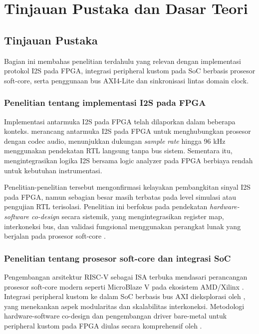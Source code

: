 \chapter{Tinjauan Pustaka dan Dasar Teori}

\section{Tinjauan Pustaka}

Bagian ini membahas penelitian terdahulu yang relevan dengan implementasi protokol I2S pada FPGA, integrasi peripheral kustom pada SoC berbasis prosesor soft-core, serta penggunaan bus AXI4-Lite dan sinkronisasi lintas domain clock.

\subsection{Penelitian tentang implementasi I2S pada FPGA}

Implementasi antarmuka I2S pada FPGA telah dilaporkan dalam beberapa konteks. \citep{sang_i2s_codec_2020} merancang antarmuka I2S pada FPGA untuk menghubungkan prosesor dengan codec audio, menunjukkan dukungan \textit{sample rate} hingga 96 kHz menggunakan pendekatan RTL langsung tanpa bus sistem. Sementara itu, \citep{kaviani_i2s_fpga_2017} mengintegrasikan logika I2S bersama logic analyzer pada FPGA berbiaya rendah untuk kebutuhan instrumentasi.

Penelitian-penelitian tersebut mengonfirmasi kelayakan pembangkitan sinyal I2S pada FPGA, namun sebagian besar masih terbatas pada level simulasi atau pengujian RTL terisolasi. Penelitian ini berfokus pada pendekatan \textit{hardware-software co-design} secara sistemik, yang mengintegrasikan register map, interkoneksi bus, dan validasi fungsional menggunakan perangkat lunak yang berjalan pada prosesor soft-core \citep{lafosse_embedded_2018}.

\subsection{Penelitian tentang prosesor soft-core dan integrasi SoC}

Pengembangan arsitektur RISC-V sebagai ISA terbuka \citep{waterman_riscv_2016} mendasari perancangan prosesor soft-core modern seperti MicroBlaze V pada ekosistem AMD/Xilinx \citep{xilinx_microblaze_ref_2021}. Integrasi peripheral kustom ke dalam SoC berbasis bus AXI dieksplorasi oleh \citep{sklyarov_axi_peripheral_2014}, yang menekankan aspek modularitas dan skalabilitas interkoneksi. Metodologi hardware-software co-design dan pengembangan driver bare-metal untuk peripheral kustom pada FPGA diulas secara komprehensif oleh \citep{crockett_zynq_book_2014}.

